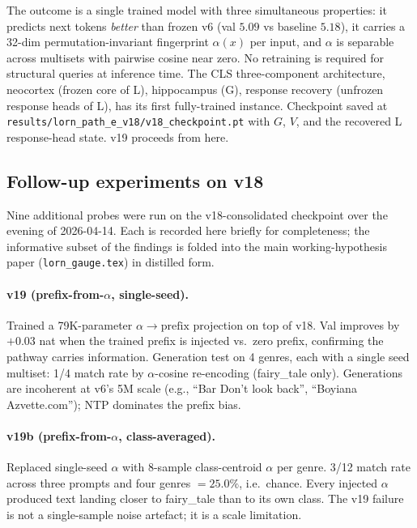 \documentclass[11pt, a4paper]{article}
\theoremstyle{plain}
\theoremstyle{definition}
\theoremstyle{remark}
\begin{document}
The outcome is a single trained model with three simultaneous properties: it predicts next tokens \emph{better} than frozen v6 (val $5.09$ vs baseline $5.18$), it carries a 32-dim permutation-invariant fingerprint $\alpha(x)$ per input, and $\alpha$ is separable across multisets with pairwise cosine near zero.
No retraining is required for structural queries at inference time.
The CLS three-component architecture, neocortex (frozen core of L), hippocampus (G), response recovery (unfrozen response heads of L), has its first fully-trained instance.
Checkpoint saved at \texttt{results/lorn\_path\_e\_v18/v18\_checkpoint.pt} with $G$, $V$, and the recovered L response-head state.
v19 proceeds from here.

\subsection{Follow-up experiments on v18}

Nine additional probes were run on the v18-consolidated checkpoint over the evening of 2026-04-14.
Each is recorded here briefly for completeness; the informative subset of the findings is folded into the main working-hypothesis paper (\texttt{lorn\_gauge.tex}) in distilled form.

\paragraph{v19 (prefix-from-$\alpha$, single-seed).}
Trained a 79K-parameter $\alpha \to \mathrm{prefix}$ projection on top of v18. Val improves by $+0.03$ nat when the trained prefix is injected vs.\ zero prefix, confirming the pathway carries information.
Generation test on 4 genres, each with a single seed multiset: 1/4 match rate by $\alpha$-cosine re-encoding (fairy\_tale only).
Generations are incoherent at v6's 5M scale (e.g., ``Bar Don't look back'', ``Boyiana Azvette.com''); NTP dominates the prefix bias.

\paragraph{v19b (prefix-from-$\alpha$, class-averaged).}
Replaced single-seed $\alpha$ with 8-sample class-centroid $\alpha$ per genre. 3/12 match rate across three prompts and four genres $= 25.0\%$, i.e.\ chance.
Every injected $\alpha$ produced text landing closer to fairy\_tale than to its own class.
The v19 failure is not a single-sample noise artefact; it is a scale limitation.
\end{document}
